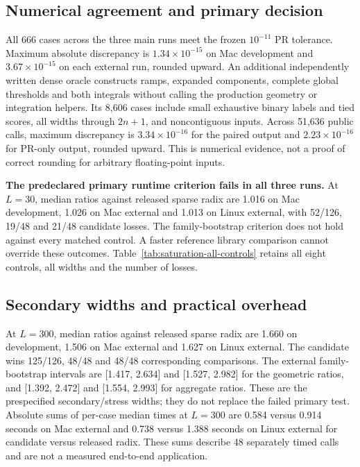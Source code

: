 \subsection{Numerical agreement and primary decision}
All 666 cases across the three main runs meet the frozen $10^{-11}$ PR
tolerance. Maximum absolute discrepancy is $1.34\times10^{-15}$ on Mac
development and $3.67\times10^{-15}$ on each external run, rounded upward.
An additional independently written dense oracle constructs ramps, expanded
components, complete global thresholds and both integrals without calling
the production geometry or integration helpers. Its 8,606 cases include
small exhaustive binary labels and tied scores, all widths through $2n+1$,
and noncontiguous inputs. Across 51,636 public calls, maximum discrepancy is
$3.34\times10^{-16}$ for the paired output and $2.23\times10^{-16}$ for
PR-only output, rounded upward. This is numerical evidence, not a proof of
correct rounding for arbitrary floating-point inputs.

\textbf{The predeclared primary runtime criterion fails in all three runs.}
At $L=30$, median ratios against released sparse radix are 1.016 on Mac
development, 1.026 on Mac external and 1.013 on Linux external, with
52/126, 19/48 and 21/48 candidate losses. The family-bootstrap criterion
does not hold against every matched control. A faster reference library
comparison cannot override these outcomes. Table~\ref{tab:saturation-all-controls}
retains all eight controls, all widths and the number of losses.


\subsection{Secondary widths and practical overhead}
At $L=300$, median ratios against released sparse radix are 1.660 on
development, 1.506 on Mac external and 1.627 on Linux external. The candidate
wins 125/126, 48/48 and 48/48 corresponding comparisons. The external
family-bootstrap intervals are [1.417, 2.634] and [1.527, 2.982] for the
geometric ratios, and [1.392, 2.472] and [1.554, 2.993] for aggregate ratios.
These are the prespecified secondary/stress widths; they do not replace
the failed primary test. Absolute sums of per-case median times at $L=300$
are 0.584 versus 0.914 seconds on Mac external and 0.738 versus 1.388 seconds
on Linux external for candidate versus released radix. These sums describe
48 separately timed calls and are not a measured end-to-end application.

